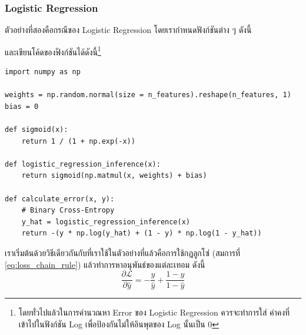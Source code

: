 \subsubsection{Logistic Regression}

ตัวอย่างที่สองคือกรณีของ Logistic Regression โดยเรากำหนดฟังก์ชันต่าง ๆ ดังนี้


\vspace{1em}
\noindent และเขียนโค้ดของฟังก์ชันได้ดังนี้\footnote{โดยทั่วไปแล้วในการคำนวณหา Error ของ Logistic Regression ควรจะทำการใส่    ค่าคงที่เข้าไปในฟังก์ชัน Log เพื่อป้องกันไม่ให้อินพุตของ Log นั้นเป็น 0}

\begin{lstlisting}[style=MyPython]
import numpy as np

weights = np.random.normal(size = n_features).reshape(n_features, 1)
bias = 0

def sigmoid(x):
    return 1 / (1 + np.exp(-x))

def logistic_regression_inference(x):
    return sigmoid(np.matmul(x, weights) + bias)

def calculate_error(x, y):
    # Binary Cross-Entropy
    y_hat = logistic_regression_inference(x)
    return -(y * np.log(y_hat) + (1 - y) * np.log(1 - y_hat))
\end{lstlisting}

\vspace{1em}
เราเริ่มต้นด้วยวิธีเดียวกันกับที่เราใช้ในตัวอย่างที่แล้วคือการใช้กฎลูกโซ่ (สมการที่ \eqref{eq:loss_chain_rule}) แล้วทำการหาอนุพันธ์ของแต่ละเทอม ดังนี้
%
\begin{equation}
    \frac{\partial \mathcal{L}}{\partial \hat{y}} = -\frac{y}{\hat{y}} + \frac{1-y}{1-\hat{y}}
\end{equation}

